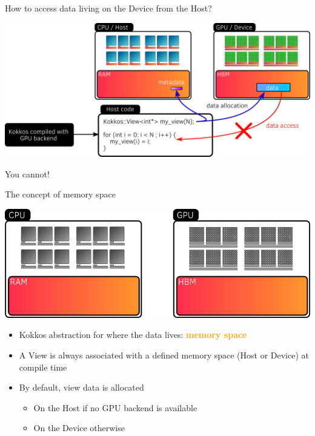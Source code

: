 \documentclass[aspectratio=169]{beamer}
\newcommand{\highlight}[1]{\textcolor{orange}{\textbf{#1}}}
\begin{document}

\begin{frame}{How to access data living on the Device from the Host?}
    \begin{center}
        \includegraphics[width=\textwidth]{device_memory_access.png}
    \end{center}

     You cannot!
\end{frame}


\begin{frame}{The concept of memory space}
    \begin{center}
        \includegraphics[width=0.7\linewidth]{memory_space.png}
    \end{center}
    \begin{itemize}
        \item Kokkos abstraction for where the data lives: \highlight{memory space}
        \item A View is always associated with a defined memory space (Host or Device) at compile time
        \item By default, view data is allocated
        \begin{itemize}
            \item On the Host if no GPU backend is available
            \item On the Device otherwise
        \end{itemize}
    \end{itemize}
\end{frame}
\end{document}
